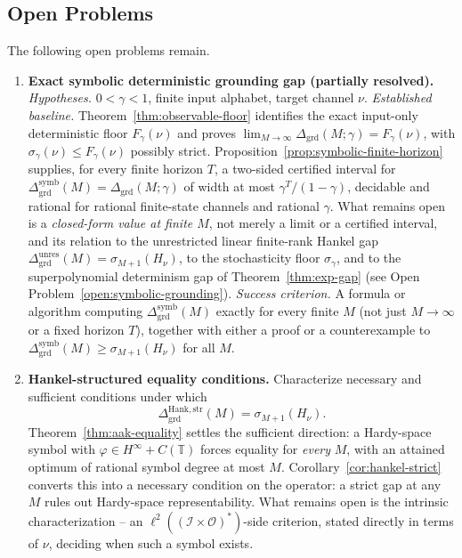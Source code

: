 \documentclass[12pt]{article}
\theoremstyle{definition}
\newcommand{\Dunres}{\Delta_{\mathrm{grd}}^{\mathrm{unres}}}
\newcommand{\DHankstr}{\Delta_{\mathrm{grd}}^{\mathrm{Hank,str}}}
\begin{document}
\subsection{Open Problems}
\label{sec:openproblems}
\label{subsec:open-problems}

The following open problems remain.

\begin{enumerate}[leftmargin=2.0em]
\item \textbf{Exact symbolic deterministic grounding gap (partially resolved).}
\emph{Hypotheses.} $0<\gamma<1$, finite input alphabet, target channel $\nu$.
\emph{Established baseline.} Theorem~\ref{thm:observable-floor} identifies
the exact input-only deterministic floor $F_\gamma(\nu)$ and proves
$\lim_{M\to\infty}\Delta_{\mathrm{grd}}(M;\gamma)=F_\gamma(\nu)$, with
$\sigma_\gamma(\nu)\le F_\gamma(\nu)$ possibly strict.
Proposition~\ref{prop:symbolic-finite-horizon} supplies, for every finite
horizon $T$, a two-sided certified interval for
$\Delta_{\mathrm{grd}}^{\mathrm{symb}}(M)=\Delta_{\mathrm{grd}}(M;\gamma)$ of
width at most $\gamma^T/(1-\gamma)$, decidable and rational for rational
finite-state channels and rational $\gamma$.  What remains open is a
\emph{closed-form value at finite $M$}, not merely a limit or a certified
interval, and its relation to the unrestricted linear finite-rank Hankel gap
$\Dunres(M)=\sigma_{M+1}(H_\nu)$, to the stochasticity floor $\sigma_\gamma$,
and to the superpolynomial determinism gap of
Theorem~\ref{thm:exp-gap} (see Open Problem~\ref{open:symbolic-grounding}).
\emph{Success criterion.} A formula or algorithm computing
$\Delta_{\mathrm{grd}}^{\mathrm{symb}}(M)$ exactly for every finite $M$ (not
just $M\to\infty$ or a fixed horizon $T$), together with either a proof or a
counterexample to $\Delta_{\mathrm{grd}}^{\mathrm{symb}}(M)\ge\sigma_{M+1}(H_\nu)$
for all $M$.

\item \textbf{Hankel-structured equality conditions.}
Characterize necessary and sufficient conditions under which
\[
\DHankstr(M)
=
\sigma_{M+1}(H_\nu).
\]
Theorem~\ref{thm:aak-equality} settles the sufficient direction: a Hardy-space
symbol with $\varphi\in H^\infty+C(\mathbb T)$ forces equality for
\emph{every} $M$, with an attained optimum of rational symbol degree at most
$M$.  Corollary~\ref{cor:hankel-strict} converts this into a necessary
condition on the operator: a strict gap at any $M$ rules out Hardy-space
representability.  What remains open is the intrinsic characterization -- an
$\ell^2((\mathcal I\times\mathcal O)^*)$-side criterion, stated directly in
terms of $\nu$, deciding when such a symbol exists.


\end{enumerate}
\end{document}
